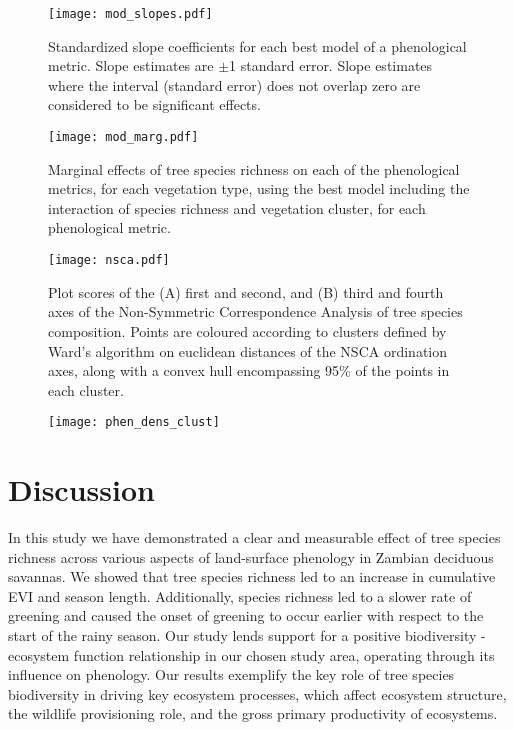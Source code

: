 \documentclass[11pt,a4paper]{article}
\begin{document}


 

\begin{figure}[H]
\centering
	\texttt{[image: mod\_slopes.pdf]}
	\caption{Standardized slope coefficients for each best model of a phenological metric. Slope estimates are $\pm$1 standard error. Slope estimates where the interval (standard error) does not overlap zero are considered to be significant effects.}
	\label{mod_slopes}
\end{figure}

\begin{figure}[H]
\centering
	\texttt{[image: mod\_marg.pdf]}
	\caption{Marginal effects of tree species richness on each of the phenological metrics, for each vegetation type, using the best model including the interaction of species richness and vegetation cluster, for each phenological metric.}
	\label{mod_marg}
\end{figure}

\begin{figure}[H]
\centering
	\texttt{[image: nsca.pdf]}
	\caption{Plot scores of the (A) first and second, and (B) third and fourth axes of the Non-Symmetric Correspondence Analysis of tree species composition. Points are coloured according to clusters defined by Ward's algorithm on euclidean distances of the NSCA ordination axes, along with a convex hull encompassing 95\% of the points in each cluster.}
	\label{nsca}
\end{figure}

\begin{figure}[H]
\centering
	\texttt{[image: phen\_dens\_clust]}
	\caption{}
	\label{phen_dens_clust}
\end{figure}

\section{Discussion}

In this study we have demonstrated a clear and measurable effect of tree species richness across various aspects of land-surface phenology in Zambian deciduous savannas. We showed that tree species richness led to an increase in cumulative EVI and season length. Additionally, species richness led to a slower rate of greening and caused the onset of greening to occur earlier with respect to the start of the rainy season. Our study lends support for a positive biodiversity - ecosystem function relationship in our chosen study area, operating through its influence on phenology. Our results exemplify the key role of tree species biodiversity in driving key ecosystem processes, which affect ecosystem structure, the wildlife provisioning role, and the gross primary productivity of ecosystems.
\end{document}
